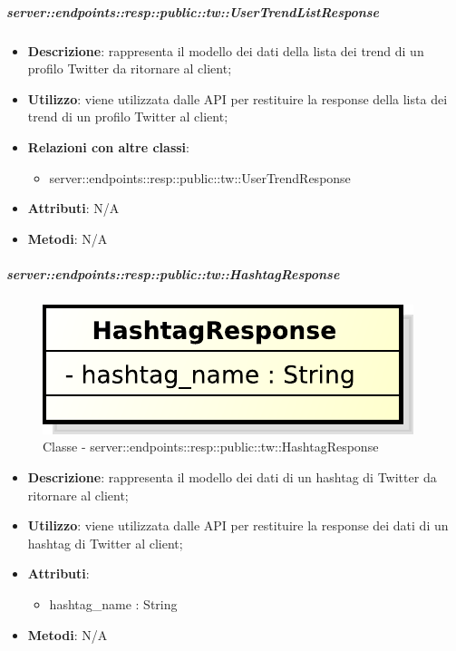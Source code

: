    \subparagraph{server::endpoints::resp::public::tw::UserTrendListResponse} %
    \label{subp:bdsm_app_server_endpoints_resp_public_tw_usertrendlistresponse}
    \begin{itemize}
      \item \textbf{Descrizione}: rappresenta il modello dei dati della lista dei trend di un profilo Twitter da ritornare al client;
      \item \textbf{Utilizzo}: viene utilizzata dalle API per restituire la response della lista dei trend di un profilo Twitter al client;
      \item \textbf{Relazioni con altre classi}:
        \begin{itemize}
          \item server::endpoints::resp::public::tw::UserTrendResponse
        \end{itemize}
	  \item \textbf{Attributi}: N/A
	  \item \textbf{Metodi}: N/A
    \end{itemize}

    \subparagraph{server::endpoints::resp::public::tw::HashtagResponse} %
    \label{subp:bdsm_app_server_endpoints_resp_public_tw_hashtagresponse}
	\begin{figure}[!htbp]
		\centering
		\centerline{\includegraphics[scale=0.6]{./images/server/classes/endpoints/tw/hashtag_response.pdf}}
		\caption{Classe - server::endpoints::resp::public::tw::HashtagResponse}
	\end{figure}
    \begin{itemize}
      \item \textbf{Descrizione}: rappresenta il modello dei dati di un hashtag di Twitter da ritornare al client;
      \item \textbf{Utilizzo}: viene utilizzata dalle API per restituire la response dei dati di un hashtag di Twitter al client;

	  \item \textbf{Attributi}:
	  	\begin{itemize}
	  		\item hashtag\_name : String
	  	\end{itemize}
	  \item \textbf{Metodi}: N/A
    \end{itemize}

